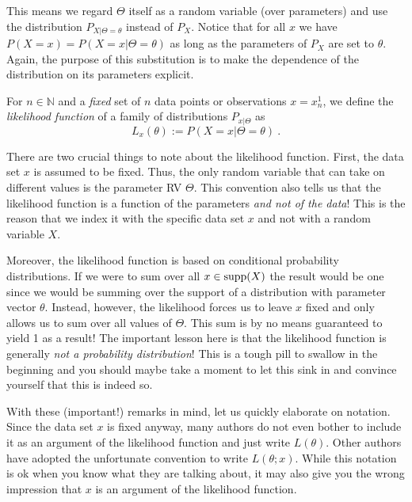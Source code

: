 This means we regard $ \Theta $ itself as a random variable (over parameters) and use the distribution $ P_{X|\Theta=\theta} $ instead of $ P_{X} $. Notice that for all
$ x $ we have $ P(X=x) = P(X=x|\Theta = \theta) $ as long as the parameters of $ P_{X} $ are set to $ \theta $. Again, the purpose of this substitution is to make
the dependence of the distribution on its parameters explicit.

\begin{Definition}\label{def:likelihood}
For $n \in \mathbb{N} $ and a \emph{fixed} set of $n$ data points or observations $ x = x^{1}_{n} $, we define the \emph{likelihood function} of a 
family of distributions $ P_{x|\Theta} $ as $$ L_{x}(\theta) := P(X=x|\Theta = \theta) \ . $$
\end{Definition}

There are two crucial things to note about the likelihood function. First, the data set $ x $ is assumed to be fixed. Thus, the only random variable that can take
on different values is the parameter RV $ \Theta $. This convention also tells us that the likelihood function is a function of the parameters \emph{and not of the data}! This is the reason that we index it with the
specific data set $ x $ and not with a random variable $ X $.

Moreover, the likelihood function is based on conditional probability distributions. If we were to sum over all $ x \in \operatorname{supp}(X) $ the result would be one since 
we would be summing over the support of a distribution with parameter vector $ \theta $. Instead, however, the likelihood forces us to leave $ x $ fixed and
only allows us to sum over all values of $ \Theta $. This sum is by no means guaranteed to yield 1 as a result! The important lesson here is that the likelihood 
function is generally \emph{not a probability distribution}! This is a tough pill to swallow in the beginning and you should maybe take a moment to let this sink in
and convince yourself that this is indeed so.

With these (important!) remarks in mind, let us quickly elaborate on notation. Since the data set $ x $ is fixed anyway, many authors do not even bother to include
it as an argument of the likelihood function and just write $ L(\theta) $. Other authors have adopted
the unfortunate convention to write $ L(\theta; x) $. While this notation is ok when you know what they are talking
about, it may also give you the wrong impression that $ x $ is an argument of the likelihood function. 

